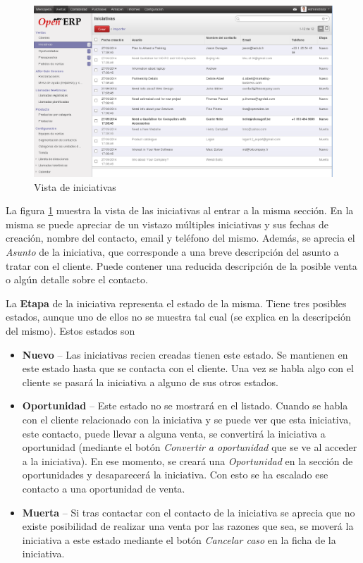 \begin{figure}[H]
\includegraphics[width=\textwidth]{ventas/img/ven_iniciativas.png}
\caption{Vista de iniciativas}
\label{ven:iniciativas}
\end{figure}

La figura \ref{ven:iniciativas} muestra la vista de las iniciativas al entrar a la misma sección. En la misma se puede apreciar de un
vistazo múltiples iniciativas y sus fechas de creación, nombre del contacto, email y teléfono del mismo. Además, se aprecia el \emph{Asunto} de la 
iniciativa, que corresponde a una breve descripción del asunto a tratar con el cliente. Puede contener una reducida descripción de la posible
venta o algún detalle sobre el contacto.

La \textbf{Etapa} de la iniciativa representa el estado de la misma. Tiene tres posibles estados, aunque uno de ellos no se muestra tal cual (se explica en la descripción del mismo). Estos estados son

\begin{itemize}
  \item \textbf{Nuevo} -- Las iniciativas recien creadas tienen este estado. Se mantienen en este estado hasta que se contacta con el 
                          cliente. Una vez se habla algo con el cliente se pasará la iniciativa a alguno de sus otros estados.
  \item \textbf{Oportunidad} -- Este estado no se mostrará en el listado. Cuando se habla con el cliente relacionado con la iniciativa
                y se puede ver que esta iniciativa, este contacto, puede llevar a alguna venta, se convertirá la iniciativa a oportunidad (mediante el botón \emph{Convertir a oportunidad} que se ve al acceder a la iniciativa).
                En ese momento, se creará una \emph{Oportunidad} en la sección de oportunidades y desaparecerá la iniciativa. Con 
                esto se ha escalado ese contacto a una oportunidad de venta.
  \item  \textbf{Muerta} -- Si tras contactar con el contacto de la iniciativa se aprecia que no existe posibilidad de realizar una venta
               por las razones que sea, se moverá la iniciativa a este estado mediante el botón \emph{Cancelar caso} en la ficha de la 
               iniciativa.
\end{itemize}




